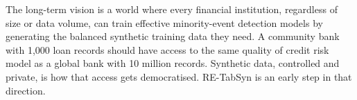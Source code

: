The long-term vision is a world where every financial institution, regardless of size or data volume, can train effective minority-event detection models by generating the balanced synthetic training data they need. A community bank with 1,000 loan records should have access to the same quality of credit risk model as a global bank with 10 million records. Synthetic data, controlled and private, is how that access gets democratised. RE-TabSyn is an early step in that direction.
